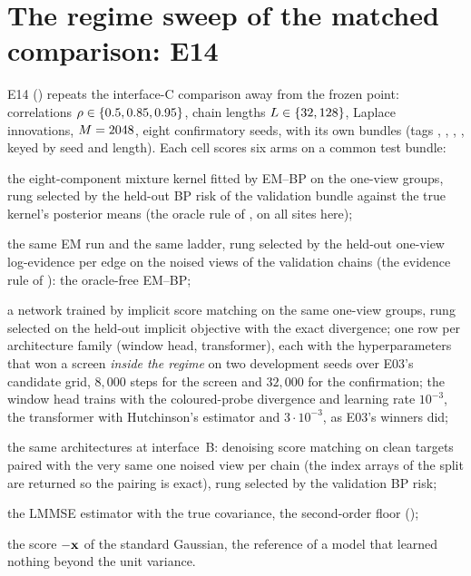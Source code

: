 \section{The regime sweep of the matched comparison: E14}
\label{sec:e14}

E14 () repeats the interface-C comparison
away from the frozen point: correlations $\rho\in\{0.5,0.85,0.95\}$, chain lengths
$L\in\{32,128\}$, Laplace innovations, $M=2048$, eight confirmatory seeds, with
its own bundles (tags , , ,
, keyed by seed and length). Each cell scores six arms on a common
test bundle:
\begin{description}[leftmargin=2.2em,itemsep=0.25em]
\item[\code{em\_bp}] the eight-component mixture kernel fitted by EM--BP on the one-view
  groups, rung selected by the held-out BP risk of the validation bundle against the
  true kernel's posterior means (the oracle rule of , on all sites
  here);
\item[\code{em\_bp\_evidence}] the same EM run and the same ladder, rung selected by the
  held-out one-view log-evidence per edge on the noised views of the validation chains
  (the evidence rule of ): the oracle-free EM--BP;
\item[\code{ism\_one\_view}] a network trained by implicit score matching on the same
  one-view groups, rung selected on the held-out implicit objective with the exact
  divergence; one row per architecture family (window head, transformer), each with the
  hyperparameters that won a screen \emph{inside the regime} on two development seeds
  over E03's candidate grid, $8{,}000$ steps for the screen and $32{,}000$ for the
  confirmation; the window head trains with the coloured-probe divergence and learning
  rate $10^{-3}$, the transformer with Hutchinson's estimator and $3\cdot10^{-3}$, as
  E03's winners did;
\item[\code{dsm\_one\_corruption}] the same architectures at interface~B: denoising score
  matching on clean targets paired with the very same one noised view per chain
  (the index arrays of the split are returned so the pairing is exact), rung selected by
  the validation BP risk;
\item[\code{lmmse\_true}] the LMMSE estimator with the true covariance, the second-order
  floor ();
\item[\code{isotropic}] the score $-\mathbf{x}$ of the standard Gaussian, the reference of a
  model that learned nothing beyond the unit variance.
\end{description}

